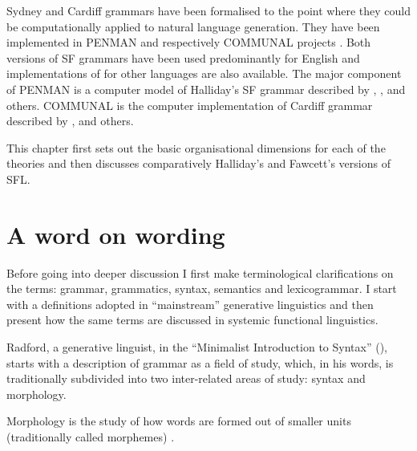 Sydney and Cardiff grammars have been formalised to the point where they could be computationally applied to natural language generation. They have been implemented in PENMAN \citep{PenmanOverview,Penman89} and respectively COMMUNAL projects \citep{Fawcett90-communal}. Both versions of SF grammars have been used predominantly for English and implementations of for other languages are also available. The major component of PENMAN is a computer model of Halliday's SF grammar described by \citet{gazebo}, \citet{MatthiessenBateman91}, \citep{Matthiessen-lexcartog-book} and others. COMMUNAL is the computer implementation of Cardiff grammar described by \citet{Fawcett:1988}, \citet{Fawcett93-ewnlg4} and others. 

This chapter first sets out the basic organisational dimensions for each of the theories and then discusses comparatively Halliday's \citep{Halliday2002} and Fawcett's \citep{Fawcett2000} versions of SFL.


\section{A word on wording}
Before going into deeper discussion I first make terminological clarifications on the terms: grammar, grammatics, syntax, semantics and lexicogrammar. I start with a definitions adopted in ``mainstream'' generative linguistics and then present how the same terms are discussed in systemic functional linguistics.

Radford, a generative linguist, in the ``Minimalist Introduction to Syntax'' (\citeyear{Radford1997}), starts with a description of grammar as a field of study, which, in his words, is traditionally subdivided into two inter-related areas of study: syntax and morphology. %

\begin{definition}\label{def:morphology-min}
Morphology is the study of how words are formed out of smaller units (traditionally called morphemes) \citep[1]{Radford1997}.
\end{definition}

